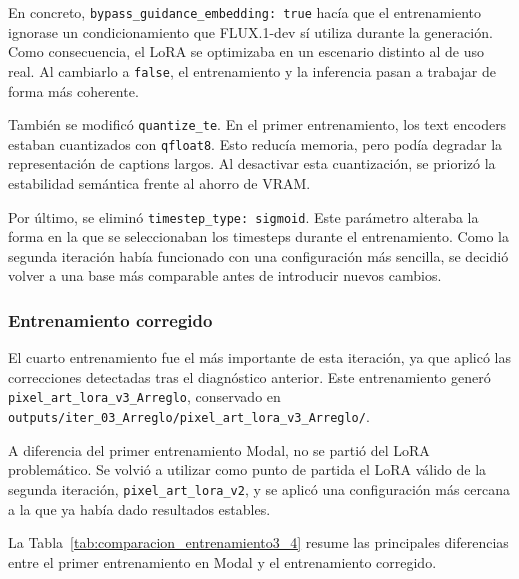 \documentclass[a4paper,11pt,titlepage]{scrbook}
\begin{document}
En concreto, \texttt{bypass\_guidance\_embedding: true} hacía que el entrenamiento ignorase un condicionamiento que FLUX.1-dev sí utiliza durante la generación. Como consecuencia, el LoRA se optimizaba en un escenario distinto al de uso real. Al cambiarlo a \texttt{false}, el entrenamiento y la inferencia pasan a trabajar de forma más coherente.

También se modificó \texttt{quantize\_te}. En el primer entrenamiento, los text encoders estaban cuantizados con \texttt{qfloat8}. Esto reducía memoria, pero podía degradar la representación de captions largos. Al desactivar esta cuantización, se priorizó la estabilidad semántica frente al ahorro de VRAM.

Por último, se eliminó \texttt{timestep\_type: sigmoid}. Este parámetro alteraba la forma en la que se seleccionaban los timesteps durante el entrenamiento. Como la segunda iteración había funcionado con una configuración más sencilla, se decidió volver a una base más comparable antes de introducir nuevos cambios.

\subsubsection{Entrenamiento corregido}

El cuarto entrenamiento fue el más importante de esta iteración, ya que aplicó las correcciones detectadas tras el diagnóstico anterior. Este entrenamiento generó \texttt{pixel\_art\_lora\_v3\_Arreglo}, conservado en \texttt{outputs/iter\_03\_Arreglo/pixel\_art\_lora\_v3\_Arreglo/}.

A diferencia del primer entrenamiento Modal, no se partió del LoRA problemático. Se volvió a utilizar como punto de partida el LoRA válido de la segunda iteración, \texttt{pixel\_art\_lora\_v2}, y se aplicó una configuración más cercana a la que ya había dado resultados estables.

La Tabla~\ref{tab:comparacion_entrenamiento3_4} resume las principales diferencias entre el primer entrenamiento en Modal y el entrenamiento corregido.
\end{document}
